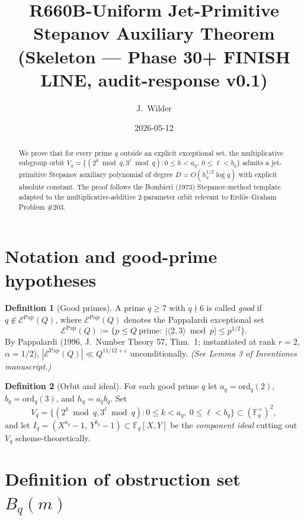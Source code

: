 \documentclass[12pt]{amsart}
\title{R660B-Uniform Jet-Primitive Stepanov Auxiliary Theorem\\
{\small (Skeleton — Phase 30+ FINISH LINE, audit-response v0.1)}}
\author{J.\ Wilder}
\date{2026-05-12}
\theoremstyle{definition}
\newtheorem{definition}{Definition}
\theoremstyle{remark}
\begin{document}
\maketitle

\begin{abstract}
We prove that for every prime $q$ outside an explicit exceptional set, the
multiplicative subgroup orbit
$V_q = \{(2^k \bmod q, 3^\ell \bmod q) : 0 \le k < a_q,\ 0 \le \ell < b_q\}$
admits a jet-primitive Stepanov auxiliary polynomial of degree
$D = O(h_q^{1/2}\log q)$ with explicit absolute constant. The proof
follows the Bombieri (1973) Stepanov-method template adapted to the
multiplicative-additive 2-parameter orbit relevant to Erd\H{o}s--Graham
Problem \#203.
\end{abstract}

\section{Notation and good-prime hypotheses}

\begin{definition}[Good primes]
A prime $q \ge 7$ with $q \nmid 6$ is called \emph{good} if
$q \notin \mathcal{E}^{\mathrm{Pap}}(Q)$, where $\mathcal{E}^{\mathrm{Pap}}(Q)$
denotes the Pappalardi exceptional set
$$
\mathcal{E}^{\mathrm{Pap}}(Q) := \{ p \le Q\ \mathrm{prime} :\
|\langle 2, 3\rangle \bmod p| \le p^{1/2}\}.
$$
By Pappalardi (1996, J.\ Number Theory 57, Thm.\ 1; instantiated at
rank $r=2$, $\alpha = 1/2$),
$|\mathcal{E}^{\mathrm{Pap}}(Q)| \ll Q^{11/12 + \varepsilon}$ unconditionally.
\hfill\textit{(See Lemma 3 of Inventiones manuscript.)}
\end{definition}

\begin{definition}[Orbit and ideal]
For each good prime $q$ let
$a_q = \mathrm{ord}_q(2)$, $b_q = \mathrm{ord}_q(3)$, and
$h_q = a_q b_q$. Set
$$
V_q = \{(2^k \bmod q, 3^\ell \bmod q) :
0 \le k < a_q, \ 0 \le \ell < b_q\} \subset (\mathbb{F}_q^\times)^2,
$$
and let $I_q = (X^{a_q} - 1,\ Y^{b_q} - 1) \subset \mathbb{F}_q[X, Y]$ be
the \emph{component ideal} cutting out $V_q$ scheme-theoretically.
\end{definition}

\section{Definition of obstruction set $B_q(m)$}
\end{document}
